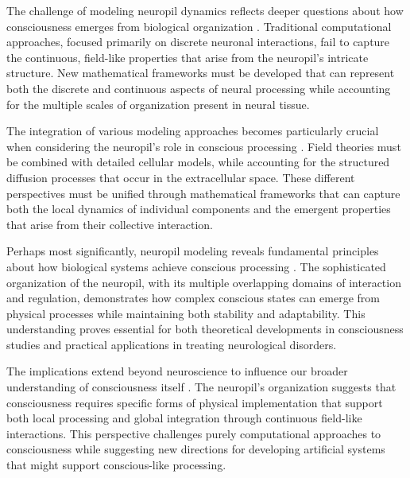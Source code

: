 The challenge of modeling neuropil dynamics reflects deeper questions about how consciousness emerges from biological organization \cite{Denk2004}. Traditional computational approaches, focused primarily on discrete neuronal interactions, fail to capture the continuous, field-like properties that arise from the neuropil's intricate structure. New mathematical frameworks must be developed that can represent both the discrete and continuous aspects of neural processing while accounting for the multiple scales of organization present in neural tissue.

The integration of various modeling approaches becomes particularly crucial when considering the neuropil's role in conscious processing \cite{Haehn2014}. Field theories must be combined with detailed cellular models, while accounting for the structured diffusion processes that occur in the extracellular space. These different perspectives must be unified through mathematical frameworks that can capture both the local dynamics of individual components and the emergent properties that arise from their collective interaction.

Perhaps most significantly, neuropil modeling reveals fundamental principles about how biological systems achieve conscious processing \cite{Helmstaedter2013}. The sophisticated organization of the neuropil, with its multiple overlapping domains of interaction and regulation, demonstrates how complex conscious states can emerge from physical processes while maintaining both stability and adaptability. This understanding proves essential for both theoretical developments in consciousness studies and practical applications in treating neurological disorders.

The implications extend beyond neuroscience to influence our broader understanding of consciousness itself \cite{White1986}. The neuropil's organization suggests that consciousness requires specific forms of physical implementation that support both local processing and global integration through continuous field-like interactions. This perspective challenges purely computational approaches to consciousness while suggesting new directions for developing artificial systems that might support conscious-like processing.